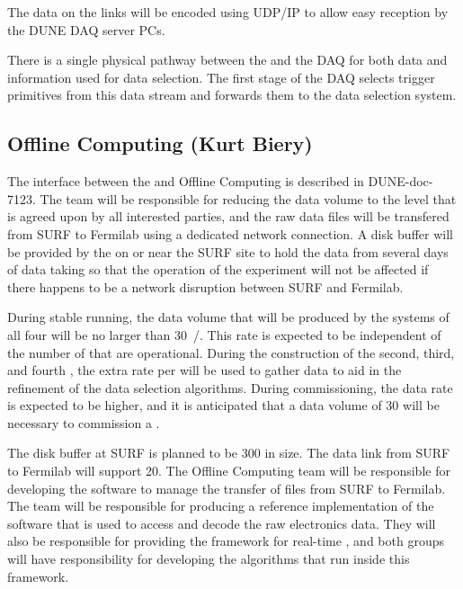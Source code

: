 The data on the links will be encoded using UDP/IP to allow easy
reception by the DUNE DAQ server PCs.

There is a single physical pathway between the  and the DAQ for
both data and information used for data selection. The first stage of
the DAQ selects trigger primitives from this data stream and forwards
them to the data selection system.

\subsection{Offline Computing (Kurt Biery)}
\label{sec:fd-daq-intfc-fnal-cmptg}

The interface between the  and Offline Computing is described in
DUNE-doc-7123. The  team will be responsible for reducing the
data volume to the level that is agreed upon by all interested parties,
and the raw data files will be transfered from SURF to Fermilab using
a dedicated network connection. A disk buffer will be provided by the
 on or near the SURF site to hold the data from several days
of data taking so that the operation of the experiment will not be affected
if there happens to be a network disruption between SURF and Fermilab.

During stable running, the data volume that will be produced by the
 systems of all four  will be no larger
than \SI{30}{\PB/\year}. This rate is expected to be independent of the number
of  that are operational. During the construction
of the second, third, and fourth , the extra rate
per  will be used to gather data to aid in the
refinement of the data selection algorithms.
During commissioning, the data rate is expected to  be higher,
and it is anticipated that a data volume
of \SI{30}{\PB} will be necessary to commission a .

The disk buffer at SURF is planned to be \SI{300}{\TB} in size.  The data
link from SURF to Fermilab will support \SI{20}{\Gbps}.  The Offline Computing
team will be responsible for developing the software to manage the
transfer of files from SURF to Fermilab. The  team will be
responsible for producing a
reference implementation of the software that is used to access and
decode the raw electronics data. They will also be responsible for
providing the framework for real-time , and
both groups will have responsibility for developing the 
algorithms that run inside this framework.

